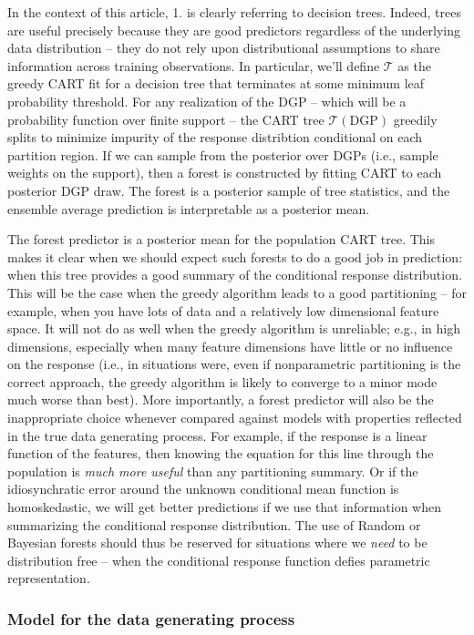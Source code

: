 \documentclass[12pt]{article}
\begin{document}
In the context of this article, 1. is clearly referring to decision trees.   Indeed, trees are useful precisely because they are good predictors regardless of the underlying data distribution -- they do not rely upon distributional assumptions to share information across training observations.  In particular, we'll define $\mathcal{T}$ as the greedy CART fit for a decision tree that terminates at some minimum leaf probability threshold.  For any realization of the DGP -- which will be a probability function over finite support -- the CART tree $\mathcal{T}(\text{DGP})$
greedily splits to minimize impurity of the response distribtion conditional on each partition region.
If we can sample from the posterior over DGPs (i.e., sample weights on the support), then a forest is constructed by fitting CART to each posterior DGP draw.  The forest is a posterior sample of tree statistics, and  the ensemble average prediction is interpretable as a posterior mean.


The forest predictor is a posterior mean for the population CART tree.  This makes it clear when we should expect such forests to do a good job in prediction: when this tree provides a good summary of the conditional response distribution.  This will be the case when the greedy algorithm leads to a good partitioning -- for example, when you have lots of data and a relatively low dimensional feature space.  It will not do as well when the greedy algorithm is unreliable; e.g., in high dimensions, especially when many feature dimensions have little or no influence on the response (i.e., in situations were, even if nonparametric partitioning is the correct approach, the greedy algorithm is likely to converge to a minor mode much worse than best).  More importantly, a forest predictor will also be the inappropriate choice whenever compared against models with properties reflected in the true data generating process.  For example, if the response is a linear function of the features, then knowing the equation for this line through the population is \emph{much more useful} than any partitioning summary.  Or if the idiosynchratic error around the unknown conditional mean function is homoskedastic, we will get better predictions if we use that information when summarizing the conditional response distribution.  The use of Random or Bayesian forests should thus be reserved for situations where we \emph{need} to be distribution free -- when the conditional response function defies parametric representation. 

    \subsubsection{Model for the data generating
process}\label{model-for-the-data-generating-process}
\end{document}

